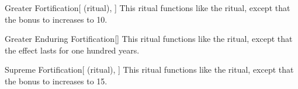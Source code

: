 \lowercase{\hypertarget{spell:Greater Fortification}{}}\label{spell:Greater Fortification}
\begin{attuneability}[\nth{3}]{\hypertarget{spell:Greater Fortification}{Greater Fortification}}[ (ritual), ]
This ritual functions like the  ritual, except that the bonus to  increases to 10.
\end{attuneability}
\vspace{0.25em}



\lowercase{\hypertarget{spell:Greater Enduring Fortification}{}}\label{spell:Greater Enduring Fortification}
\begin{apability}[\nth{5}]{\hypertarget{spell:Greater Enduring Fortification}{Greater Enduring Fortification}}[]
This ritual functions like the  ritual, except that the effect lasts for one hundred years.
\end{apability}
\vspace{0.25em}



\lowercase{\hypertarget{spell:Supreme Fortification}{}}\label{spell:Supreme Fortification}
\begin{attuneability}[\nth{6}]{\hypertarget{spell:Supreme Fortification}{Supreme Fortification}}[ (ritual), ]
This ritual functions like the  ritual, except that the bonus to  increases to 15.
\end{attuneability}
\vspace{0.25em}



